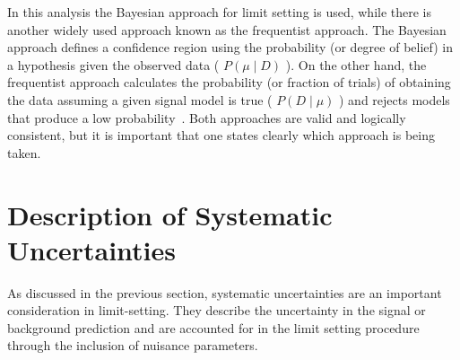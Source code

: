 In this analysis the Bayesian approach for limit setting is used,
while there is another widely used approach known as the frequentist approach.
The Bayesian approach defines a confidence region using the probability (or degree of belief) in a hypothesis given the observed data ( $P(\mu \mid D)$ ).
On the other hand, the frequentist approach calculates the probability (or fraction of trials)
of obtaining the data assuming a given signal model is true ( $P(D \mid \mu)$ ) and rejects models that produce a low probability~\cite{lim-cowan}.
Both approaches are valid and logically consistent,
but it is important that one states clearly which approach is being taken.

\section{Description of Systematic Uncertainties}
\label{sec:lim-syst}

As discussed in the previous section,
systematic uncertainties are an important consideration in limit-setting.
They describe the uncertainty in the signal or background prediction
and are accounted for in the limit setting procedure through the inclusion of nuisance parameters.

